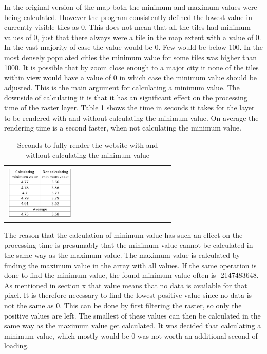 In the original version of the map both the minimum and maximum values were being calculated. However the program consistently defined the lowest value in currently visible tiles as 0.
This does not mean that all the tiles had minimum values of 0, just that there always were a tile in the map extent with a value of 0. In the vast majority of case the value would be 0. Few would be below 100. In the most densely populated cities the minimum value for some tiles was higher than 1000. 
It is possible that by zoom close enough to a major city it none of the tiles within view would have a value of 0 in which case the minimum value should be adjusted.
This is the main argument for calculating a minimum value. The downside of calculating it is that it has an significant effect on the processing time of the raster layer. Table \ref{tabMinimum} shows the time in seconds it takes for the layer to be rendered with and without calculating the minimum value. On average the rendering time is a second faster, when not calculating the minimum value.
\begin{table}[htbp]
	\centering
	\begin{tabular}{l}
		\includegraphics[width=0.4\textwidth]{Pictures/tabMinimum}
	\end{tabular}
	\caption{Seconds to fully render the website with and without calculating the minimum value}
	\label{tabMinimum}
\end{table}

The reason that the calculation of minimum value has such an effect on the processing time is presumably that the minimum value cannot be calculated in the same way as the maximum value. 
The maximum value is calculated by finding the maximum value in the array with all values. 
If the same operation is done to find the minimum value, the found minimum value often is -2147483648. As mentioned in section x that value means that no data is available for that pixel. 
It is therefore necessary to find the lowest positive value since no data is not the same as 0. This can be done by first filtering the raster, so only the positive values are left. The smallest of these values can then be calculated in the same way as the maximum value get calculated. 
It was decided that calculating a minimum value, which mostly would be 0 was not worth an additional second of loading. 

